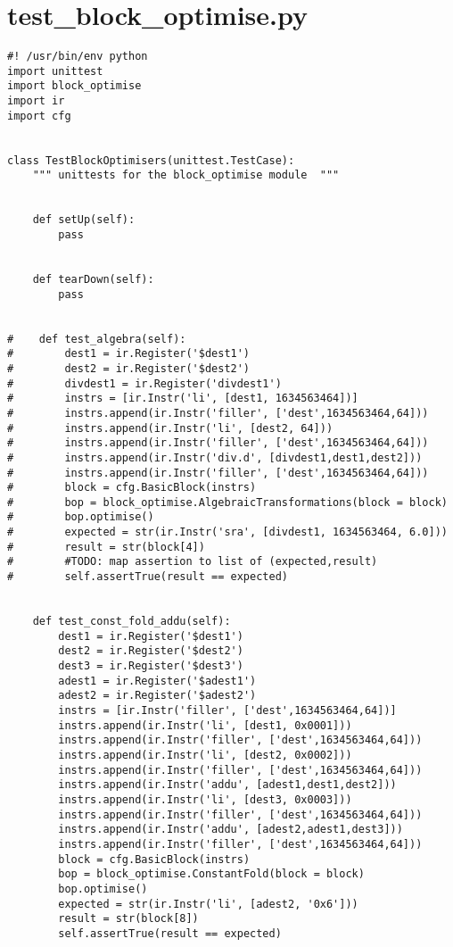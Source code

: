 \section{test\_block\_optimise.py}
%
\begin{lstlisting}
#! /usr/bin/env python
import unittest
import block_optimise
import ir
import cfg


class TestBlockOptimisers(unittest.TestCase):
    """ unittests for the block_optimise module  """


    def setUp(self):
        pass


    def tearDown(self):
        pass


#    def test_algebra(self):
#        dest1 = ir.Register('$dest1')
#        dest2 = ir.Register('$dest2')
#        divdest1 = ir.Register('divdest1')
#        instrs = [ir.Instr('li', [dest1, 1634563464])]
#        instrs.append(ir.Instr('filler', ['dest',1634563464,64]))
#        instrs.append(ir.Instr('li', [dest2, 64]))
#        instrs.append(ir.Instr('filler', ['dest',1634563464,64]))
#        instrs.append(ir.Instr('div.d', [divdest1,dest1,dest2]))
#        instrs.append(ir.Instr('filler', ['dest',1634563464,64]))
#        block = cfg.BasicBlock(instrs)
#        bop = block_optimise.AlgebraicTransformations(block = block)
#        bop.optimise()
#        expected = str(ir.Instr('sra', [divdest1, 1634563464, 6.0]))
#        result = str(block[4])
#        #TODO: map assertion to list of (expected,result)
#        self.assertTrue(result == expected)


    def test_const_fold_addu(self):
        dest1 = ir.Register('$dest1')
        dest2 = ir.Register('$dest2')
        dest3 = ir.Register('$dest3')
        adest1 = ir.Register('$adest1')
        adest2 = ir.Register('$adest2')
        instrs = [ir.Instr('filler', ['dest',1634563464,64])]
        instrs.append(ir.Instr('li', [dest1, 0x0001]))
        instrs.append(ir.Instr('filler', ['dest',1634563464,64]))
        instrs.append(ir.Instr('li', [dest2, 0x0002]))
        instrs.append(ir.Instr('filler', ['dest',1634563464,64]))
        instrs.append(ir.Instr('addu', [adest1,dest1,dest2]))
        instrs.append(ir.Instr('li', [dest3, 0x0003]))
        instrs.append(ir.Instr('filler', ['dest',1634563464,64]))
        instrs.append(ir.Instr('addu', [adest2,adest1,dest3]))
        instrs.append(ir.Instr('filler', ['dest',1634563464,64]))
        block = cfg.BasicBlock(instrs)
        bop = block_optimise.ConstantFold(block = block)
        bop.optimise()
        expected = str(ir.Instr('li', [adest2, '0x6']))
        result = str(block[8])
        self.assertTrue(result == expected)



\end{lstlisting}
